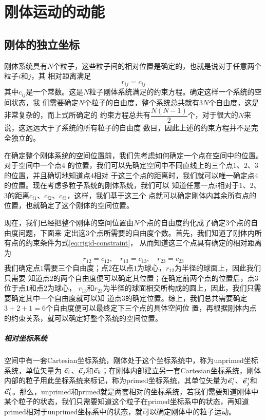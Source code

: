 \chapter{刚体运动的动能}

\section{刚体的独立坐标}

刚体系统具有$N$个粒子，这些粒子间的相对位置是确定的，也就是说对于任意两个粒子$i$和$j$，其
相对距离满足
\begin{equation}
	r_{ij} = c_{ij}	\label{eq:rigid-constraint}
\end{equation} 
其中$c_{ij}$是一个常数。这是$N$粒子刚体系统满足的约束方程。确定这样一个系统的空间状态，我
们需要确定$N$个粒子的自由度，整个系统总共就有$3N$个自由度，这是非常复杂的，而上式所确定的
约束方程总共有$\dfrac{N(N-1)}{2}$个，对于很大的$N$来说，这远远大于了系统的所有粒子的自由度
数目，因此上述的约束方程并不是完全独立的。

在确定整个刚体系统的空间位置前，我们先考虑如何确定一个点在空间中的位置。对于空间中一个点$4$
的位置，我们可以先确定空间中不同直线上的三个点$1$、$2$、$3$的位置，并且确切地知道点$4$相对
于这三个点的距离时，我们就可以唯一确定点$4$的位置。现在考虑多粒子系统的刚体系统，我们可以
知道任意一点$i$相对于$1$、$2$、$3$的距离$c_{i1}$、$c_{i2}$、$c_{i3}$，这样，我们基于这三个
点就可以确定刚体内其余所有点的位置，也就确定了这个刚体的空间位置。

现在，我们已经把整个刚体的空间位置由$N$个点的自由度约化成了确定$3$个点的自由度问题，下面来
定出这$3$个点所需要的自由度个数。首先，我们知道了刚体内所有点的约束条件为式\eqref{eq:rigid-constraint}，
从而知道这三个点具有确定的相对距离为
\begin{equation*}
	r_{12} = c_{12}, \quad r_{13} = c_{13}, \quad r_{23} = c_{23}
\end{equation*} 
我们确定点$1$需要三个自由度；点$2$在以点$1$为球心，$r_{12}$为半径的球面上，因此我们只需要
知道点$2$的两个自由度便可以确定其位置；在确定前两个点的位置后，点$3$位于点$1$和点$2$为球心，
$r_{13}$和$r_{23}$为半径的球面相交所构成的圆上，因此，我们只需要确定其中一个自由度就可以知
道点$3$的确定位置。综上，我们总共需要确定$3+2+1=6$个自由度便可以最终定下三个点的具体空间位
置，再根据刚体内点的约束关系，就可以确定好整个系统的空间位置。

\paragraph*{相对坐标系统}
\begin{figure}[htbp]
	\centering
	
	\label{fig:relative-coord}
\end{figure}
空间中有一套Cartesian坐标系统，刚体处于这个坐标系统中，称为unprimed坐标系统，单位矢量为
$\vec{\bm{e}}_{i}$、$\vec{\bm{e}}_{j}$和$\vec{\bm{e}}_{k}$；在刚体内部建立另一套Cartesian坐标系统，刚体内部的粒子用此坐标系统来标记，称为primed坐标系统，其单位矢量为$\vec{\bm{e}}_{i}^{\,\prime}$、$\vec{\bm{e}}_{j}^{\,\prime}$和$\vec{\bm{e}}_{k}^{\,\prime}$。那么，unprimed和primed就是两套相对的坐标系统，若我们需要知道刚体中某个粒子的状态，我们只需要知道这个粒子在primed坐标系中的状态，再知道primed相对于unprimed坐标系中的状态，就可以确定刚体中的粒子运动。

